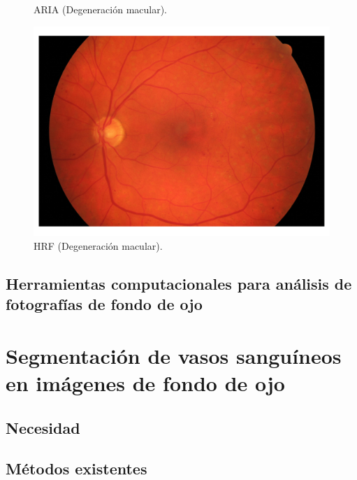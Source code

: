 \begin{figure}[h]
	\caption[ARIA]{ARIA (Degeneración macular).}\label{fig:ARIA}
\endminipage\hfill
{}
	\includegraphics[width=\linewidth]{Figures/images2}
	\caption[HRF]{HRF (Degeneración macular).}\label{fig:HRF}
\endminipage\hfill

\end{figure}



\subsection{Herramientas computacionales para an\'alisis de fotograf\'ias de fondo de ojo}


\section{Segmentaci\'on de vasos sangu\'ineos en im\'agenes de fondo de ojo}



\subsection{Necesidad}


\subsection{M\'etodos existentes}
